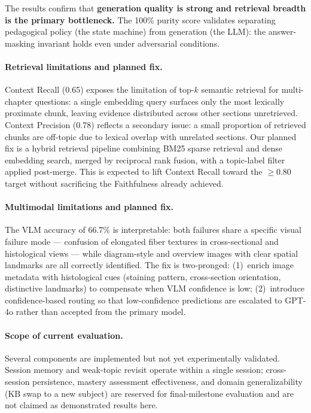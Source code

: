 \documentclass[11pt]{article}
\begin{document}
The results confirm that \textbf{generation quality is strong and retrieval
breadth is the primary bottleneck.}
The 100\% purity score validates separating pedagogical policy (the state
machine) from generation (the LLM): the answer-masking invariant holds even
under adversarial conditions.

\paragraph{Retrieval limitations and planned fix.}
Context Recall (0.65) exposes the limitation of top-$k$ semantic retrieval
for multi-chapter questions: a single embedding query surfaces only the
most lexically proximate chunk, leaving evidence distributed across other
sections unretrieved.
Context Precision (0.78) reflects a secondary issue: a small proportion of
retrieved chunks are off-topic due to lexical overlap with unrelated sections.
Our planned fix is a hybrid retrieval pipeline combining BM25 sparse retrieval
and dense embedding search, merged by reciprocal rank fusion, with a
topic-label filter applied post-merge.
This is expected to lift Context Recall toward the $\geq$0.80 target without
sacrificing the Faithfulness already achieved.

\paragraph{Multimodal limitations and planned fix.}
The VLM accuracy of 66.7\% is interpretable: both failures share a specific
visual failure mode --- confusion of elongated fiber textures in
cross-sectional and histological views --- while diagram-style and overview
images with clear spatial landmarks are all correctly identified.
The fix is two-pronged: (1)~enrich image metadata with histological cues
(staining pattern, cross-section orientation, distinctive landmarks) to
compensate when VLM confidence is low; (2)~introduce confidence-based
routing so that low-confidence predictions are escalated to GPT-4o
\citep{gpt4o} rather than accepted from the primary model.

\paragraph{Scope of current evaluation.}
Several components are implemented but not yet experimentally validated.
Session memory and weak-topic revisit operate within a single session;
cross-session persistence, mastery assessment effectiveness, and domain
generalizability (KB swap to a new subject) are reserved for
final-milestone evaluation and are not claimed as demonstrated results here.
\end{document}
